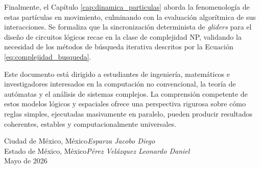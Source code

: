 Finalmente, el Capítulo \ref{cap:dinamica_particulas} aborda la fenomenología de estas partículas en movimiento, culminando con la evaluación algorítmica de sus interacciones. Se formaliza que la sincronización determinista de \textit{gliders} para el diseño de circuitos lógicos recae en la clase de complejidad NP, validando la necesidad de los métodos de búsqueda iterativa descritos por la Ecuación \eqref{eq:complejidad_busqueda}.

Este documento está dirigido a estudiantes de ingeniería, matemáticos e investigadores interesados en la computación no convencional, la teoría de autómatas y el análisis de sistemas complejos. La comprensión competente de estos modelos lógicos y espaciales ofrece una perspectiva rigurosa sobre cómo reglas simples, ejecutadas masivamente en paralelo, pueden producir resultados coherentes, estables y computacionalmente universales.

\vspace{\baselineskip}
\begin{flushright}\noindent
Ciudad de México, México\hfill {\it Esparza Jacobo Diego}\\
Estado de México, México\hfill {\it Pérez Velázquez Leonardo Daniel}\\
Mayo de 2026\hfill ~\\
\end{flushright}